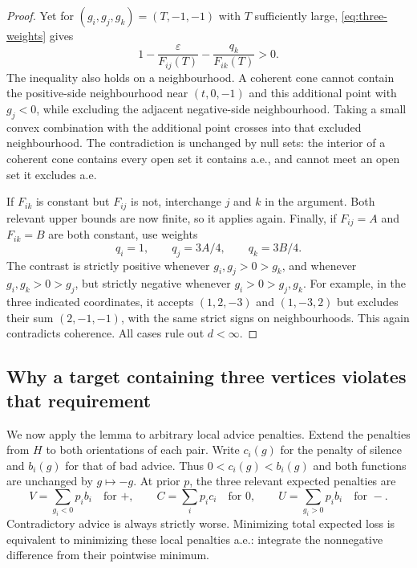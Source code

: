 \documentclass[11pt]{article}
\theoremstyle{remark}
\begin{document}
\begin{proof}
Yet for $(g_i,g_j,g_k)=(T,-1,-1)$ with $T$ sufficiently large,
\eqref{eq:three-weights} gives
\[
 1-\frac{\varepsilon}{F_{ij}(T)}-\frac{q_k}{F_{ik}(T)}>0.
\]
The inequality also holds on a neighbourhood. A coherent cone cannot
contain the positive-side neighbourhood near $(t,0,-1)$ and this additional
point with $g_j<0$, while excluding the adjacent negative-side neighbourhood.
Taking a small convex combination with the additional point crosses into
that excluded neighbourhood. The contradiction is unchanged by null sets:
the interior of a coherent cone contains every open set it contains a.e.,
and cannot meet an open set it excludes a.e.

If $F_{ik}$ is constant but $F_{ij}$ is not, interchange $j$ and $k$ in the
argument. Both relevant upper bounds are now finite, so it applies again.
Finally, if $F_{ij}=A$ and $F_{ik}=B$ are both constant, use weights
\[
 q_i=1,\qquad q_j=3A/4,\qquad q_k=3B/4.
\]
The contrast is strictly positive whenever $g_i,g_j>0>g_k$, and whenever
$g_i,g_k>0>g_j$, but strictly negative whenever $g_i>0>g_j,g_k$.
For example, in the three indicated coordinates, it accepts
$(1,2,-3)$ and $(1,-3,2)$ but excludes their sum $(2,-1,-1)$, with the same
strict signs on neighbourhoods. This again contradicts coherence.
All cases rule out $d<\infty$.
\end{proof}

\subsection*{Why a target containing three vertices violates that requirement}

We now apply the lemma to arbitrary local advice penalties. Extend the
penalties from $H$ to both orientations of each pair. Write $c_i(g)$ for
the penalty of silence and $b_i(g)$ for that of bad advice. Thus
$0<c_i(g)<b_i(g)$ and both functions are unchanged by $g\mapsto-g$.
At prior $p$, the three relevant expected penalties are
\begin{equation}
 V=\sum_{g_i<0}p_i b_i\quad\text{for }+,\qquad
 C=\sum_i p_i c_i\quad\text{for }0,\qquad
 U=\sum_{g_i>0}p_i b_i\quad\text{for }-.
 \label{eq:three-costs}
\end{equation}
Contradictory advice is always strictly worse. Minimizing total expected
loss is equivalent to minimizing these local penalties a.e.: integrate
the nonnegative difference from their pointwise minimum.
\end{document}
